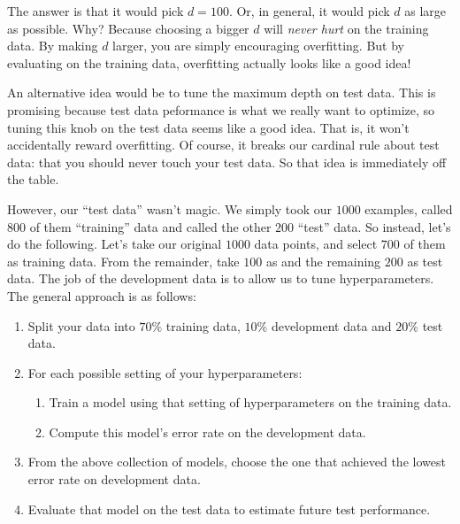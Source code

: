 The answer is that it would pick $d=100$.  Or, in general, it would
pick $d$ as large as possible.  Why?  Because choosing a bigger $d$
will \emph{never hurt} on the training data.  By making $d$ larger,
you are simply encouraging overfitting.  But by evaluating on the
training data, overfitting actually looks like a good idea!

An alternative idea would be to tune the maximum depth on test data.
This is promising because test data peformance is what we really want
to optimize, so tuning this knob on the test data seems like a good
idea.  That is, it won't accidentally reward overfitting.  Of course,
it breaks our cardinal rule about test data: that you should never
touch your test data.  So that idea is immediately off the table.

However, our ``test data'' wasn't magic.  We simply took our $1000$
examples, called $800$ of them ``training'' data and called the other
$200$ ``test'' data.  So instead, let's do the following.  Let's take
our original $1000$ data points, and select $700$ of them as training
data.  From the remainder, take $100$ as  and the remaining $200$ as test
data.  The job of the development data is to allow us to tune
hyperparameters.  The general approach is as follows:

\begin{enumerate}
\item Split your data into $70\%$ training data, $10\%$ development
  data and $20\%$ test data.

\item For each possible setting of your hyperparameters:

\begin{enumerate}
\item Train a model using that setting of hyperparameters on the
  training data.

\item Compute this model's error rate on the development data.
\end{enumerate}

\item From the above collection of models, choose the one that
  achieved the lowest error rate on development data.

\item Evaluate that model on the test data to estimate future test
  performance.
\end{enumerate}

